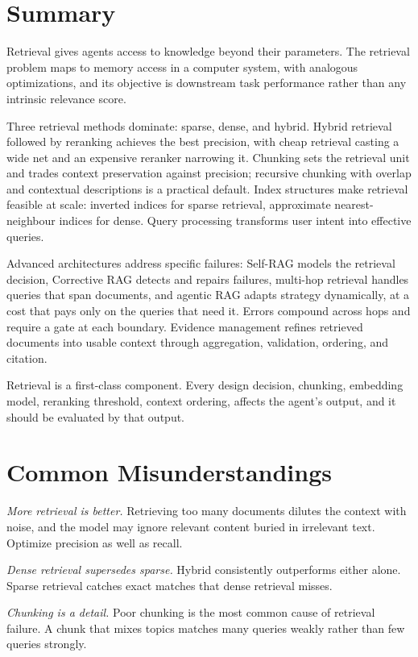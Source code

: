 \documentclass[11pt]{book}
\begin{document}
\section{Summary}

Retrieval gives agents access to knowledge beyond their parameters. The retrieval problem maps to memory access in a computer system, with analogous optimizations, and its objective is downstream task performance rather than any intrinsic relevance score.

Three retrieval methods dominate: sparse, dense, and hybrid. Hybrid retrieval followed by reranking achieves the best precision, with cheap retrieval casting a wide net and an expensive reranker narrowing it. Chunking sets the retrieval unit and trades context preservation against precision; recursive chunking with overlap and contextual descriptions is a practical default. Index structures make retrieval feasible at scale: inverted indices for sparse retrieval, approximate nearest-neighbour indices for dense. Query processing transforms user intent into effective queries.

Advanced architectures address specific failures: Self-RAG models the retrieval decision, Corrective RAG detects and repairs failures, multi-hop retrieval handles queries that span documents, and agentic RAG adapts strategy dynamically, at a cost that pays only on the queries that need it. Errors compound across hops and require a gate at each boundary. Evidence management refines retrieved documents into usable context through aggregation, validation, ordering, and citation.

Retrieval is a first-class component. Every design decision, chunking, embedding model, reranking threshold, context ordering, affects the agent's output, and it should be evaluated by that output.

\section{Common Misunderstandings}

\textit{More retrieval is better.} Retrieving too many documents dilutes the context with noise, and the model may ignore relevant content buried in irrelevant text. Optimize precision as well as recall.

\textit{Dense retrieval supersedes sparse.} Hybrid consistently outperforms either alone. Sparse retrieval catches exact matches that dense retrieval misses.

\textit{Chunking is a detail.} Poor chunking is the most common cause of retrieval failure. A chunk that mixes topics matches many queries weakly rather than few queries strongly.
\end{document}
